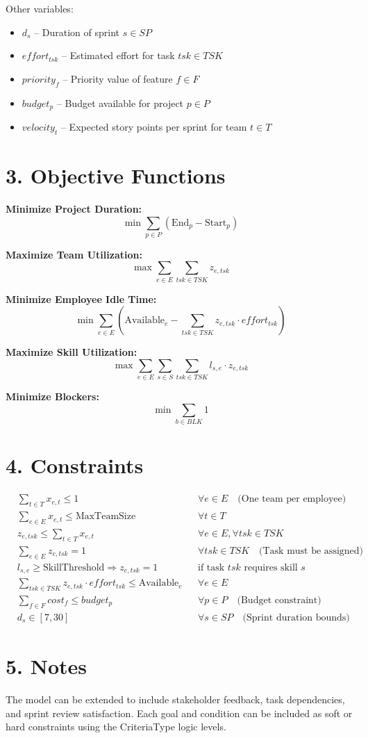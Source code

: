 \documentclass{article}
\begin{document}
Other variables:
\begin{itemize}
    \item $d_{s}$ – Duration of sprint $s \in SP$
    \item $effort_{tsk}$ – Estimated effort for task $tsk \in TSK$
    \item $priority_f$ – Priority value of feature $f \in F$
    \item $budget_p$ – Budget available for project $p \in P$
    \item $velocity_t$ – Expected story points per sprint for team $t \in T$
\end{itemize}

\section*{3. Objective Functions}
\textbf{Minimize Project Duration:}
\[
\min \sum_{p \in P} (\text{End}_p - \text{Start}_p)
\]

\textbf{Maximize Team Utilization:}
\[
\max \sum_{e \in E} \sum_{tsk \in TSK} z_{e,tsk}
\]

\textbf{Minimize Employee Idle Time:}
\[
\min \sum_{e \in E} \left(\text{Available}_e - \sum_{tsk \in TSK} z_{e,tsk} \cdot effort_{tsk} \right)
\]

\textbf{Maximize Skill Utilization:}
\[
\max \sum_{e \in E} \sum_{s \in S} \sum_{tsk \in TSK} l_{s,e} \cdot z_{e,tsk}
\]

\textbf{Minimize Blockers:}
\[
\min \sum_{b \in BLK} 1
\]

\section*{4. Constraints}
\begin{align*}
&\sum_{t \in T} x_{e,t} \leq 1 && \forall e \in E \quad \text{(One team per employee)} \\
&\sum_{e \in E} x_{e,t} \leq \text{MaxTeamSize} && \forall t \in T \\
&z_{e,tsk} \leq \sum_{t \in T} x_{e,t} && \forall e \in E, \forall tsk \in TSK \\
&\sum_{e \in E} z_{e,tsk} = 1 && \forall tsk \in TSK \quad \text{(Task must be assigned)} \\
&l_{s,e} \geq \text{SkillThreshold} \Rightarrow z_{e,tsk} = 1 && \text{if task } tsk \text{ requires skill } s \\
&\sum_{tsk \in TSK} z_{e,tsk} \cdot effort_{tsk} \leq \text{Available}_e && \forall e \in E \\
&\sum_{f \in F} cost_f \leq budget_p && \forall p \in P \quad \text{(Budget constraint)} \\
&d_s \in [7, 30] && \forall s \in SP \quad \text{(Sprint duration bounds)}
\end{align*}

\section*{5. Notes}
The model can be extended to include stakeholder feedback, task dependencies, and sprint review satisfaction. Each goal and condition can be included as soft or hard constraints using the CriteriaType logic levels.
\end{document}
